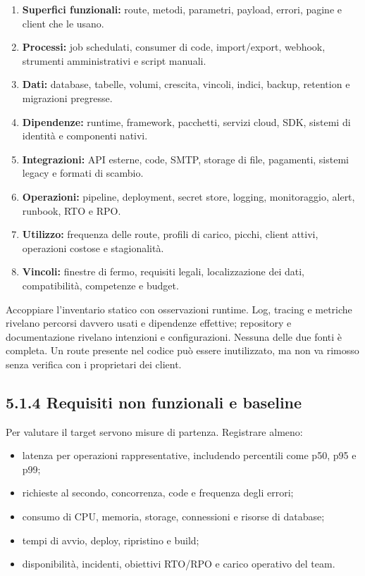 \documentclass[
  italian,
  10pt,
]{book}
\providecommand{\tightlist}{%
  \setlength{\itemsep}{0pt}\setlength{\parskip}{0pt}}
\begin{document}
\begin{enumerate}
\def\labelenumi{\arabic{enumi}.}
\tightlist
\item
  \textbf{Superfici funzionali:} route, metodi, parametri, payload,
  errori, pagine e client che le usano.
\item
  \textbf{Processi:} job schedulati, consumer di code, import/export,
  webhook, strumenti amministrativi e script manuali.
\item
  \textbf{Dati:} database, tabelle, volumi, crescita, vincoli, indici,
  backup, retention e migrazioni pregresse.
\item
  \textbf{Dipendenze:} runtime, framework, pacchetti, servizi cloud,
  SDK, sistemi di identità e componenti nativi.
\item
  \textbf{Integrazioni:} API esterne, code, SMTP, storage di file,
  pagamenti, sistemi legacy e formati di scambio.
\item
  \textbf{Operazioni:} pipeline, deployment, secret store, logging,
  monitoraggio, alert, runbook, RTO e RPO.
\item
  \textbf{Utilizzo:} frequenza delle route, profili di carico, picchi,
  client attivi, operazioni costose e stagionalità.
\item
  \textbf{Vincoli:} finestre di fermo, requisiti legali, localizzazione
  dei dati, compatibilità, competenze e budget.
\end{enumerate}

Accoppiare l'inventario statico con osservazioni runtime. Log, tracing e
metriche rivelano percorsi davvero usati e dipendenze effettive;
repository e documentazione rivelano intenzioni e configurazioni.
Nessuna delle due fonti è completa. Un route presente nel codice può
essere inutilizzato, ma non va rimosso senza verifica con i proprietari
dei client.

\subsection{5.1.4 Requisiti non funzionali e
baseline}\label{requisiti-non-funzionali-e-baseline}

Per valutare il target servono misure di partenza. Registrare almeno:

\begin{itemize}
\tightlist
\item
  latenza per operazioni rappresentative, includendo percentili come
  p50, p95 e p99;
\item
  richieste al secondo, concorrenza, code e frequenza degli errori;
\item
  consumo di CPU, memoria, storage, connessioni e risorse di database;
\item
  tempi di avvio, deploy, ripristino e build;
\item
  disponibilità, incidenti, obiettivi RTO/RPO e carico operativo del
  team.
\end{itemize}
\end{document}
